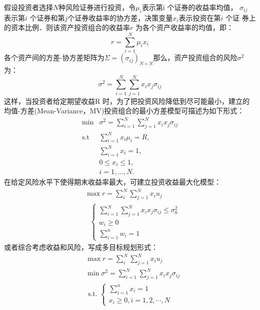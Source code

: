 \documentclass[withoutpreface,bwprint]{cumcmthesis} %
\begin{document}
假设投资者选择$N $种风险证券进行投资，令$\mu_i$表示第i 个证券的收益率均值，
$\sigma_{i j}$ 表示第$i$ 个证券和第$j $个证券收益率的协方差，决策变量$x_{i}$表示投资在第$i$ 个证
券上的资本比例．则该资产投资组合的收益率$r$ 为各个资产收益率的均值，即：
$$
r=\sum_{i=1}^{N} \mu_{i} x_{i}
$$
各个资产间的方差-协方差矩阵为$\Sigma=\left(\sigma_{i j}\right)_{N \times N}$那么，资产投资组合的风险$\sigma^{2}$为：
\begin{equation}
\sigma^{2}=\sum_{i=1}^{N} \sum_{j=1}^{N} x_{i} x_{j} \sigma_{i j}
\end{equation}
这样，当投资者给定期望收益R 时，为了把投资风险降低到尽可能最小，建立的均值-方差(Mean-Variance，MV)投资组合的最小方差模型可描述为如下形式：
\begin{equation}
\begin{array}{ll}
\min &\sigma^{2}= \sum_{i=1}^{N} \sum_{j=1}^{N} x_{i} x_{j} \sigma_{i j} \\
\text {s.t } & \sum_{i=1}^{N} x_{i} \mu_{i}=R, \\
& \sum_{i=1}^{N} x_{i}=1, \\
& 0 \leq x_{i} \leq 1, \\
& i=1, \ldots, N .
\end{array}
\label{minfc}
\end{equation}	
在给定风险水平下使得期末收益率最大，可建立投资收益最大化模型：
\begin{equation}
\begin{aligned}
&\max r=\sum_{i}^{N} \sum_{j=1}^{N} x_{i} u_{j} \\
&\text {  }\left\{\begin{array}{l}
\sum_{i=1}^{N} \sum_{j=1}^{N} x_{i} x_{j} \sigma_{i j} \leq \sigma_{0}^{2} \\
w_{i} \geq 0 \\
\sum_{i=1}^{n} w_{i}=1
\end{array}\right.
\end{aligned}
\label{maxsy}
\end{equation}
或者综合考虑收益和风险，写成多目标规划形式：
\begin{equation}
\begin{aligned}
&\max r=\sum_{i}^{N} \sum_{j=1}^{N} x_{i} u_{j} \\
&\min \sigma^{2}=\sum_{i=1}^{N} \sum_{j=1}^{N} x_{i} x_{j} \sigma_{i j} \\
&\text { s.t. }\left\{\begin{array}{l}
\sum_{i=1}^{n} x_{i}=1 \\
x_{i} \geq 0, i=1,2, \cdots, N
\end{array}\right.
\end{aligned}
\label{dmb}
\end{equation}
\end{document}
